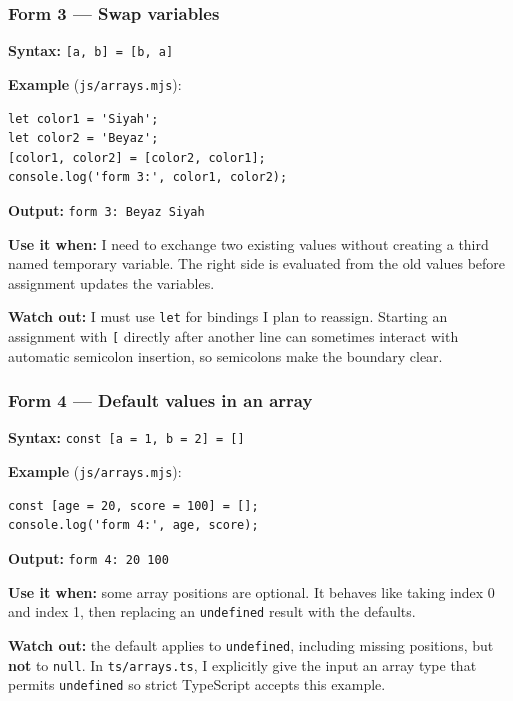 \documentclass[
  9pt,
]{article}
\newcommand{\passthrough}[1]{#1}
\begin{document}
\subsubsection{Form 3 --- Swap variables}\label{form-3-swap-variables}

\textbf{Syntax:} \passthrough{\lstinline![a, b] = [b, a]!}

\textbf{Example} (\passthrough{\lstinline!js/arrays.mjs!}):

\begin{lstlisting}
let color1 = 'Siyah';
let color2 = 'Beyaz';
[color1, color2] = [color2, color1];
console.log('form 3:', color1, color2);
\end{lstlisting}

\textbf{Output:} \passthrough{\lstinline!form 3: Beyaz Siyah!}

\textbf{Use it when:} I need to exchange two existing values without
creating a third named temporary variable. The right side is evaluated
from the old values before assignment updates the variables.

\textbf{Watch out:} I must use \passthrough{\lstinline!let!} for
bindings I plan to reassign. Starting an assignment with
\passthrough{\lstinline![!} directly after another line can sometimes
interact with automatic semicolon insertion, so semicolons make the
boundary clear.

\subsubsection{Form 4 --- Default values in an
array}\label{form-4-default-values-in-an-array}

\textbf{Syntax:} \passthrough{\lstinline!const [a = 1, b = 2] = []!}

\textbf{Example} (\passthrough{\lstinline!js/arrays.mjs!}):

\begin{lstlisting}
const [age = 20, score = 100] = [];
console.log('form 4:', age, score);
\end{lstlisting}

\textbf{Output:} \passthrough{\lstinline!form 4: 20 100!}

\textbf{Use it when:} some array positions are optional. It behaves like
taking index 0 and index 1, then replacing an
\passthrough{\lstinline!undefined!} result with the defaults.

\textbf{Watch out:} the default applies to
\passthrough{\lstinline!undefined!}, including missing positions, but
\textbf{not} to \passthrough{\lstinline!null!}. In
\passthrough{\lstinline!ts/arrays.ts!}, I explicitly give the input an
array type that permits \passthrough{\lstinline!undefined!} so strict
TypeScript accepts this example.
\end{document}
